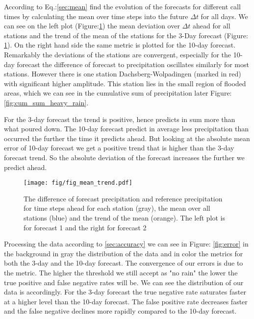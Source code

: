 \documentclass{article}
\theoremstyle{plain}
\theoremstyle{definition}
\theoremstyle{remark}
\begin{document}
According to Eq.:\ref{sec:mean} find the evolution of the forecasts for
different call times by calculating the mean over time steps into the future
$\Delta t$ for all days. We can see on the left plot
(Figure:\ref{fig:mean_trend}) the mean deviation over $\Delta t$ ahead for all
stations and the trend of the mean of the stations for the 3-Day forecast
(Figure: \ref{fig:mean_trend}). On the right hand side the same metric is
plotted for the 10-day forecast. \\
Remarkably the deviations of the stations are convergent, especially for the
10-day forecast the difference of forecast to precipitation oscillates
similarly for most stations. However there is one station Dachsberg-Wolpadingen
(marked in red) with significant  %
higher amplitude. This station lies in the small region of flooded areas, which
we can see in the cumulative sum of precipitation later
Figure:\ref{fig:cum_sum_heavy_rain}.

For the 3-day forecast the trend is positive, hence predicts in sum more than
what poured down. The 10-day forecast predict in average less precipitation
than occurred the further the time it predicts ahead. But looking at the
absolute mean error of 10-day forecast we get a positive trend that is higher
than the 3-day forecast trend. So the absolute deviation of the forecast
increases the further we predict ahead.

\begin{figure}[h]
    \centering
    \label{fig:mean_trend}
    \texttt{[image: fig/fig\_mean\_trend.pdf]}
    \caption{The difference of forecast precipitation and reference
        precipitation for time steps ahead for each station (gray), the mean over all
        stations (blue) and the trend of the mean (orange). The left plot is for
        forecast 1 and the right for forecast 2}
\end{figure}
Processing the data according to \ref{sec:accuracy} we can see in Figure:
\ref{fig:error} in the background in gray the distribution of the data and in
color the metrics for both the 3-day and the  10-day forecast. The convergence
of our errors is due to the metric. The higher the threshold we still accept as
"no rain" the lower the true positive and false negative rates will be. We can
see the distribution of our data is accordingly. For the 3-day forecast the
true negative rate saturates faster at a higher level than the 10-day forecast.
The false positive rate decreases faster and the false negative declines more
rapidly compared to the 10-day forecast.\\
\end{document}

